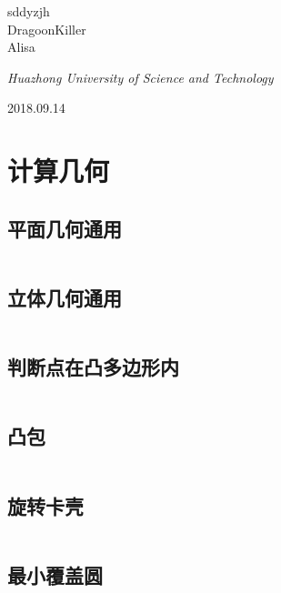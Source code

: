 \documentclass[UTF8]{ctexart}
\begin{document}
\begin{titlepage}
	{\protect sddyzjh \\ DragoonKiller \\ Alisa \\} %
	
	\vspace{0.5\baselineskip} %
	
	\textit{Huazhong University of Science and Technology} %
	
	\vfill %
	
	
\date{\today}
	2018.09.14 %
	

\end{titlepage}
\setcounter{secnumdepth}{0}

\tableofcontents
\newpage
\section{计算几何}
\subsection{平面几何通用}
\inputminted{cpp}{calculategeometry/平面几何通用.cpp}
\subsection{立体几何通用}
\inputminted{cpp}{calculategeometry/立体几何通用.cpp}
\subsection{判断点在凸多边形内}
\inputminted{cpp}{calculategeometry/判断点在凸多边形内.cpp}
\subsection{凸包}
\inputminted{cpp}{calculategeometry/凸包.cpp}
\subsection{旋转卡壳}
\inputminted{cpp}{calculategeometry/旋转卡壳.cpp}
\subsection{最小覆盖圆}
\inputminted{cpp}{calculategeometry/最小覆盖圆.cpp}
\end{document}
